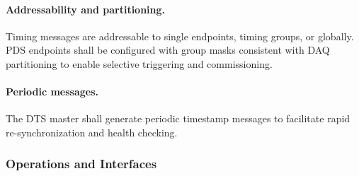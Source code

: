 \paragraph{Addressability and partitioning.}
Timing messages are addressable to single endpoints, timing groups, or globally. PDS endpoints shall be configured with group masks consistent with DAQ partitioning to enable selective triggering and commissioning.

\paragraph{Periodic messages.}
The DTS master shall generate periodic timestamp messages to facilitate rapid re-synchronization and health checking.

\subsubsection{Operations and Interfaces}
\label{subsec:timing-ops}
\label{subsec:configuration-path}

